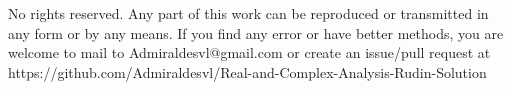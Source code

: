 \documentclass{article}
\begin{document}
\newpage
No rights reserved. Any part of this work can be reproduced or transmitted in any form or by any means. If you find any error or have better methods, you are welcome to mail to Admiraldesvl@gmail.com or create an issue/pull request at https://github.com/Admiraldesvl/Real-and-Complex-Analysis-Rudin-Solution
\end{document}
